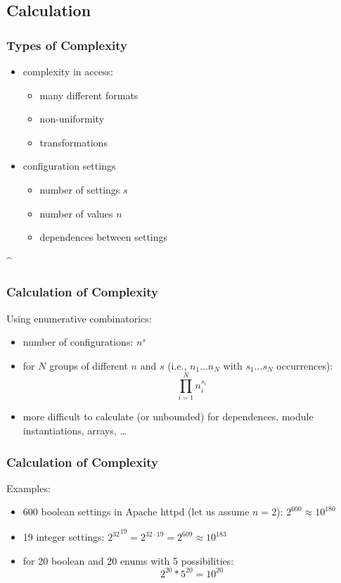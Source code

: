 \subsection{Calculation}

\begin{frame}
	\frametitle{Types of Complexity}
	\begin{itemize}
	\item complexity in access:
		\begin{itemize}
		\item many different formats
		\item non-uniformity
		\item transformations
		\end{itemize}
	\item configuration settings
		\begin{itemize}
		\item number of settings $s$
		\item number of values $n$
		\item dependences between settings
		\end{itemize}
	\end{itemize}
\end{frame}

\lstDeleteShortInline^
\begin{frame}
	\frametitle{Calculation of Complexity}

	Using enumerative combinatorics:
	\begin{itemize}
	\item number of configurations: $n^s$
	\item for $N$ groups of different $n$ and $s$ (i.e., $n_1 \dots n_N$ with $s_1 \dots s_N$ occurrences):  $$\prod_{i=1}^{N} n_i^{s_i}$$
	\item more difficult to calculate (or unbounded) for dependences, module instantiations, arrays, \dots
	\end{itemize}
\end{frame}

\begin{frame}
	\frametitle{Calculation of Complexity}

	Examples:
	\begin{itemize}
	\item 600 boolean settings in Apache httpd (let us assume $n=2$):
	\pause
	$2^{600} \approx 10^{180}$

	\item 19 integer settings:
	\pause
	${2^{32}}^{19} = 2^{32 \cdot 19} = 2^{609} \approx 10^{183}$

	\item for 20 boolean and 20 enums with 5 possibilities:
	\pause
	$$2^{20}*5^{20} = 10^{20}$$

	\end{itemize}
\end{frame}

